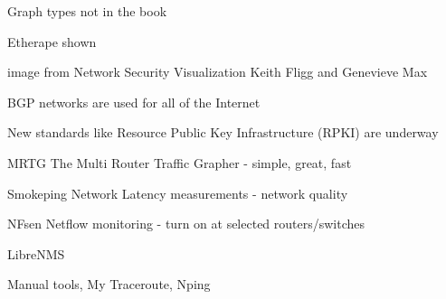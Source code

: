 \documentclass[Screen16to9,17pt]{foils}
\begin{document}


\begin{list2}
  \item Graph types not in the book
  \item Etherape shown
\end{list2}



image from Network Security Visualization Keith Fligg and Genevieve Max

\begin{list2}
  \item {}
\end{list2}







\begin{list2}
\item BGP networks are used for all of the Internet
\item New standards like Resource Public Key Infrastructure (RPKI) are underway
\end{list2}




\begin{slidelist}
\item MRTG The Multi Router Traffic Grapher - simple, great, fast\\
\item Smokeping Network Latency measurements - network quality\\
\item NFsen Netflow monitoring - turn on at selected routers/switches
\item LibreNMS 
\item Manual tools, My Traceroute, Nping
\end{slidelist}


\end{document}
